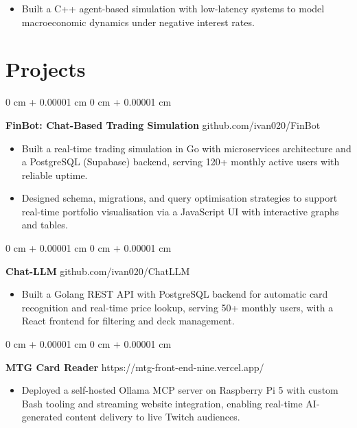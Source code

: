 \documentclass[6pt, letterpaper]{article}
\newenvironment{highlights}{
    \begin{itemize}[
        topsep=0.03 cm,
        parsep=0.03 cm,
        partopsep=0pt,
        itemsep=0pt,
        leftmargin=0 cm + 10pt
    ]
}{
    \end{itemize}
} %
\newenvironment{onecolentry}{
    \begin{adjustwidth}{
        0 cm + 0.00001 cm
    }{
        0 cm + 0.00001 cm
    }
}{
    \end{adjustwidth}
} %
\begin{document}
            \begin{highlights}

                \item Built a C++ agent-based simulation with low-latency systems to model macroeconomic dynamics under negative interest rates.

            \end{highlights}

    \section{Projects}

    \begin{onecolentry}
        \textbf{FinBot: Chat-Based Trading Simulation} \hfill github.com/ivan020/FinBot

        \begin{highlights}

            \item Built a real-time trading simulation in Go with microservices architecture and a PostgreSQL (Supabase) backend, serving 120+ monthly active users with reliable uptime.
            \item Designed schema, migrations, and query optimisation strategies to support real-time portfolio visualisation via a JavaScript UI with interactive graphs and tables.

        \end{highlights}
    \end{onecolentry}

    \begin{onecolentry}
        \textbf{Chat-LLM} \hfill github.com/ivan020/ChatLLM

        \begin{highlights}

            \item Built a Golang REST API with PostgreSQL backend for automatic card recognition and real-time price lookup, serving 50+ monthly users, with a React frontend for filtering and deck management.

        \end{highlights}
    \end{onecolentry}


    \begin{onecolentry}
        \textbf{MTG Card Reader} \hfill https://mtg-front-end-nine.vercel.app/

        \begin{highlights}

            \item Deployed a self-hosted Ollama MCP server on Raspberry Pi 5 with custom Bash tooling and streaming website integration, enabling real-time AI-generated content delivery to live Twitch audiences.

        \end{highlights}
    \end{onecolentry}
\end{document}

